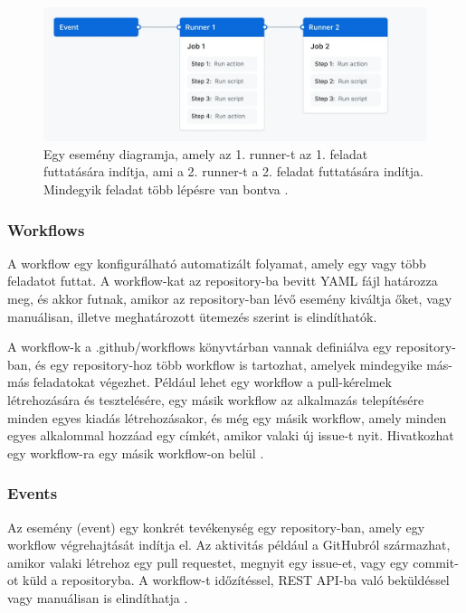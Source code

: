\begin{figure}[ht]
    \centering
         \includegraphics[width=1.0\textwidth]{figures/github/overview-actions-simple.png}
          \caption{Egy esemény diagramja, amely az 1. runner-t az 1. feladat futtatására indítja, ami a 2. runner-t a 2. feladat futtatására indítja. Mindegyik feladat több lépésre van bontva \cite{github}.}
           \label{overview-actions-simple}
\end{figure}

\subsubsection*{Workflows}
A workflow egy konfigurálható automatizált folyamat, amely egy vagy több feladatot futtat. A workflow-kat az repository-ba bevitt YAML fájl határozza meg, és akkor futnak, amikor az repository-ban lévő esemény kiváltja őket, vagy manuálisan, illetve meghatározott ütemezés szerint is elindíthatók.

A workflow-k a .github/workflows könyvtárban vannak definiálva egy repository-ban, és egy repository-hoz több workflow is tartozhat, amelyek mindegyike más-más feladatokat végezhet.
Például lehet egy workflow a pull-kérelmek létrehozására és tesztelésére, egy másik workflow az alkalmazás telepítésére minden egyes kiadás létrehozásakor, és még egy másik workflow, amely minden egyes alkalommal hozzáad egy címkét, amikor valaki új issue-t nyit. Hivatkozhat egy workflow-ra egy másik workflow-on belül \cite{github}.

\subsubsection*{Events}
Az esemény (event) egy konkrét tevékenység egy repository-ban, amely egy workflow végrehajtását indítja el.
Az aktivitás például a GitHubról származhat, amikor valaki létrehoz egy pull requestet, megnyit egy issue-et, vagy egy commit-ot küld a repositoryba. A workflow-t időzítéssel, REST API-ba való beküldéssel vagy manuálisan is elindíthatja \cite{github}.

